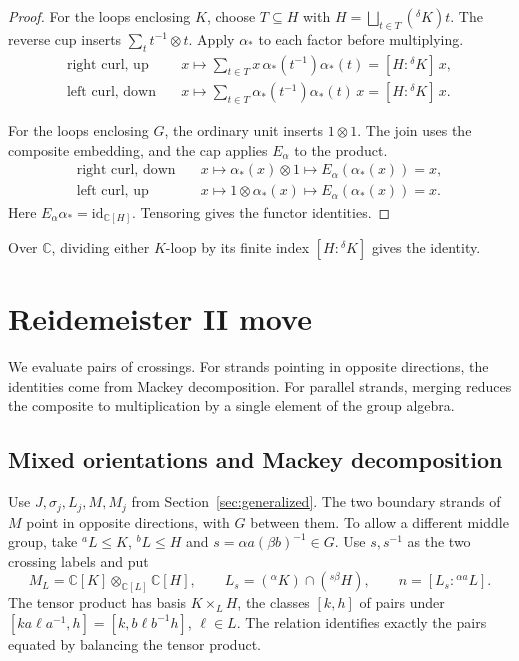 \documentclass[11pt,a4paper]{article}
\numberwithin{equation}{section}
\theoremstyle{definition}
\newcommand{\C}{\mathbb C}
\newcommand{\id}{\mathrm{id}}
\newcommand{\cg}[2]{{}^{#1}\!#2}
\begin{document}
\begin{proof}
For the loops enclosing \(K\), choose \(T\subseteq H\) with
\(H=\bigsqcup_{t\in T}(\cg{\delta}{K})t\). The reverse cup inserts
\(\sum_t t^{-1}\otimes t\). Apply \(\alpha_*\) to each factor
before multiplying.
\[
\begin{aligned}
 \text{right curl, up}\quad &x\longmapsto
   \sum\nolimits_{t\in T}x\,\alpha_*(t^{-1})\alpha_*(t)
   =[H:\cg{\delta}{K}]\,x,\\
 \text{left curl, down}\quad &x\longmapsto
   \sum\nolimits_{t\in T}\alpha_*(t^{-1})\alpha_*(t)\,x
   =[H:\cg{\delta}{K}]\,x .
\end{aligned}
\]

For the loops enclosing \(G\), the ordinary unit inserts
\(1\otimes1\). The join uses the composite embedding, and the
cap applies \(E_\alpha\) to the product.
\[
\begin{aligned}
 \text{right curl, down}\quad &x\longmapsto
   \alpha_*(x)\otimes1\longmapsto E_\alpha(\alpha_*(x))=x,\\
 \text{left curl, up}\quad &x\longmapsto
   1\otimes\alpha_*(x)\longmapsto E_\alpha(\alpha_*(x))=x .
\end{aligned}
\]
Here \(E_\alpha\alpha_*=\id_{\C[H]}\). Tensoring gives the functor
identities.
\end{proof}

Over \(\C\), dividing either \(K\)-loop by its finite index
\([H:\cg{\delta}{K}]\) gives the identity.


\section{Reidemeister II move}\label{sec:reidemeister-two}

We evaluate pairs of crossings. For strands pointing in opposite
directions, the identities come from Mackey decomposition. For
parallel strands, merging reduces the composite to multiplication
by a single element of the group algebra.

\subsection{Mixed orientations and Mackey decomposition}
Use \(J,\sigma_j,L_j,M,M_j\) from Section~\ref{sec:generalized}.
The two boundary strands of \(M\) point in opposite directions,
with \(G\) between them. To allow a different middle group, take
\(\cg{a}{L}\le K\), \(\cg{b}{L}\le H\) and
\(s=\alpha a(\beta b)^{-1}\in G\). Use \(s,s^{-1}\) as the two
crossing labels and put
\[
 M_L=\C[K]\otimes_{\C[L]}\C[H],\qquad
 L_s=(\cg{\alpha}{K})\cap(\cg{s\beta}{H}),\qquad
 n=[L_s:\cg{\alpha a}{L}].
\]
The tensor product has basis \(K\times_L H\), the classes \([k,h]\)
of pairs under \([ka\ell a^{-1},h]=[k,b\ell b^{-1}h]\),
\(\ell\in L\). The relation identifies exactly the pairs equated
by balancing the tensor product.
\end{document}
